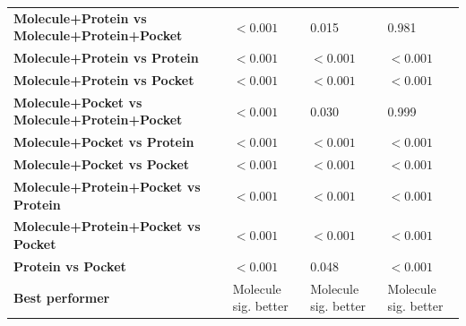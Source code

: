 \begin{table}[H]
{\begin{tabular}{llll}
        \textbf{Molecule+Protein vs Molecule+Protein+Pocket} & $< 0.001$ & 0.015 & 0.981 \\
        \textbf{Molecule+Protein vs Protein} & $< 0.001$ & $< 0.001$ & $< 0.001$ \\
        \textbf{Molecule+Protein vs Pocket} & $< 0.001$ & $< 0.001$ & $< 0.001$ \\
        \textbf{Molecule+Pocket vs Molecule+Protein+Pocket} & $< 0.001$ & 0.030 & 0.999 \\
        \textbf{Molecule+Pocket vs Protein} & $< 0.001$ & $< 0.001$ & $< 0.001$ \\
        \textbf{Molecule+Pocket vs Pocket} & $< 0.001$ & $< 0.001$ & $< 0.001$ \\
        \textbf{Molecule+Protein+Pocket vs Protein} & $< 0.001$ & $< 0.001$ & $< 0.001$ \\
        \textbf{Molecule+Protein+Pocket vs Pocket} & $< 0.001$ & $< 0.001$ & $< 0.001$ \\
        \textbf{Protein vs Pocket} & $< 0.001$ & 0.048 & $< 0.001$ \\
        \textbf{Best performer} & Molecule sig. better & Molecule sig. better & Molecule sig. better \\
        \bottomrule
    \end{tabular}}
\end{table}